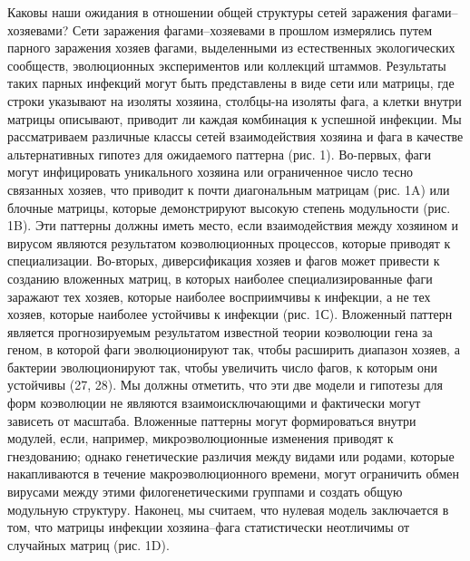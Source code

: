 \documentclass[a4paper,12pt]{article}
\begin{document}
    \par{Каковы наши ожидания в отношении общей структуры сетей заражения фагами–хозяевами? Сети заражения
    фагами–хозяевами в прошлом измерялись путем парного заражения хозяев фагами, выделенными из естественных
    экологических сообществ, эволюционных экспериментов или коллекций штаммов. Результаты таких парных инфекций могут
    быть представлены в виде сети или матрицы, где строки указывают на изоляты хозяина, столбцы-на изоляты фага, а
    клетки внутри матрицы описывают, приводит ли каждая комбинация к успешной инфекции. Мы рассматриваем различные 
    классы сетей взаимодействия хозяина и фага в качестве альтернативных гипотез для ожидаемого паттерна (рис. 1).
    Во-первых, фаги могут инфицировать уникального хозяина или ограниченное число тесно связанных хозяев, что приводит
    к почти диагональным матрицам (рис. 1A) или блочные матрицы, которые демонстрируют высокую степень модульности
    (рис. 1B). Эти паттерны должны иметь место, если взаимодействия между хозяином и вирусом являются результатом
    коэволюционных процессов, которые приводят к специализации. Во-вторых, диверсификация хозяев и фагов может привести
    к созданию вложенных матриц, в которых наиболее специализированные фаги заражают тех хозяев, которые наиболее
    восприимчивы к инфекции, а не тех хозяев, которые наиболее устойчивы к инфекции (рис. 1С). Вложенный паттерн
    является прогнозируемым результатом известной теории коэволюции гена за геном, в которой фаги эволюционируют так,
    чтобы расширить диапазон хозяев, а бактерии эволюционируют так, чтобы увеличить число фагов, к которым они
    устойчивы (27, 28). Мы должны отметить, что эти две модели и гипотезы для форм коэволюции не являются
    взаимоисключающими и фактически могут зависеть от масштаба. Вложенные паттерны могут формироваться внутри модулей,
    если, например, микроэволюционные изменения приводят к гнездованию; однако генетические различия между видами или 
    родами, которые накапливаются в течение макроэволюционного времени, могут ограничить обмен вирусами между этими
    филогенетическими группами и создать общую модульную структуру. Наконец, мы считаем, что нулевая модель заключается
    в том, что матрицы инфекции хозяина–фага статистически неотличимы от случайных матриц (рис. 1D).}
    
\end{document}

